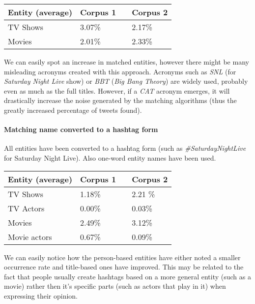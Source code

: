 \begin{center}
  \begin{tabular}{ | p{4cm} | p{2cm} | p{1cm}| p{2cm} | } \hline
    Entity (average) & Corpus 1 & & Corpus 2 \\ \hline
    TV Shows & 3.07\% & & 2.17\% \\ \hline
    Movies & 2.01\% & & 2.33\% \\ \hline
  \end{tabular}
\end{center}

We can easily spot an increase in matched entities, however there might be many
misleading acronyms created with this approach. Acronyms such as \textit{SNL}
(for \textit{Saturday Night Live} show) or  \textit{BBT} (\textit{Big Bang
Theory}) are widely used, probably even as much as the full titles. However,
if a \textit{CAT} acronym emerges, it will drastically increase the noise generated
by the matching algorithms (thus the greatly increased percentage of tweets found).

\paragraph{Matching name converted to a hashtag form}
All entities have been converted to a hashtag form (such as
\textit{\#SaturdayNightLive} for Saturday Night Live). Also one-word entity
names have been used.

\begin{center}
  \begin{tabular}{ | p{4cm} | p{2cm} | p{1cm}| p{2cm} | } \hline
    Entity (average) & Corpus 1 & & Corpus 2 \\ \hline
    TV Shows & 1.18\% & & 2.21 \% \\ \hline
    TV Actors & 0.00\% & & 0.03\% \\ \hline
    Movies & 2.49\% & & 3.12\% \\ \hline
    Movie actors & 0.67\% & & 0.09\% \\ \hline
  \end{tabular}
\end{center}

We can easily notice how the person-based entities have either noted a smaller
occurrence rate and title-based ones have improved. This may be related to the
fact that people usually create hashtags based on a more general entity (such as
a movie) rather then it's specific parts (such as actors that play in it)
when expressing their opinion.

